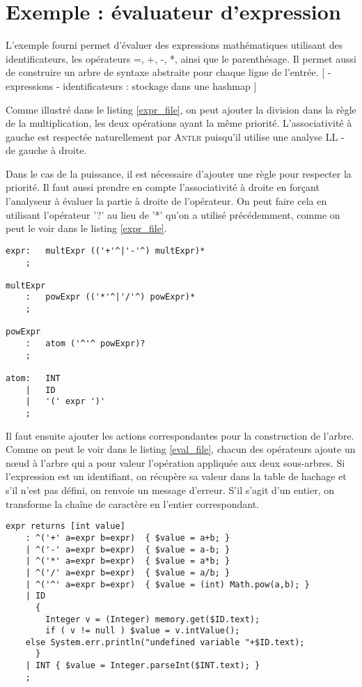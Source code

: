 \documentclass[paper=a4, fontsize=11pt]{scrartcl} %
\numberwithin{equation}{section} %
\numberwithin{figure}{section} %
\numberwithin{table}{section} %
\begin{document}

\section{Exemple : évaluateur d'expression}

L'exemple fourni permet d'évaluer des expressions mathématiques utilisant des identificateurs, les opérateurs =, +, -, *, ainsi que le parenthésage. Il permet aussi de construire un arbre de syntaxe abstraite pour chaque ligne de l'entrée.
[
- expressions
- identificateurs : stockage dans une hashmap
]


Comme illustré dans le listing \ref{expr_file}, on peut ajouter la division dans la règle de la multiplication, les deux opérations ayant la même priorité. L'associativité à gauche est respectée naturellement par \textsc{Antlr} puisqu'il utilise une analyse LL - de gauche à droite.

Dans le cas de la puissance, il est nécessaire d'ajouter une règle pour respecter la priorité. Il faut aussi prendre en compte l'associativité à droite en forçant l'analyseur à évaluer la partie à droite de l'opérateur. On peut faire cela en utilisant l'opérateur '?' au lieu de '*' qu'on a utilisé précédemment, comme on peut le voir dans le listing \ref{expr_file}.

    
\begin{lstlisting}[label=expr_file,caption=Fichier Expr.g,
linebackgroundcolor={\lstcolorlines[red!30]{8,9,10}\lstcolorlines[green!30]{5}}]
expr:   multExpr (('+'^|'-'^) multExpr)*
    ;

multExpr
    :   powExpr (('*'^|'/'^) powExpr)*
    ;

powExpr
    :   atom ('^'^ powExpr)?
    ;

atom:   INT
    |   ID
    |   '(' expr ')'
    ;
\end{lstlisting}

Il faut ensuite ajouter les actions correspondantes pour la construction de l'arbre. Comme on peut le voir dans le listing \ref{eval_file}, chacun des opérateurs ajoute un nœud à l'arbre qui a pour valeur l'opération appliquée aux deux sous-arbres. Si l'expression est un identifiant, on récupère sa valeur dans la table de hachage et s'il n'est pas défini, on renvoie un message d'erreur. S'il s'agit d'un entier, on transforme la chaîne de caractère en l'entier correspondant. 

\begin{lstlisting}[label=eval_file,caption=Fichier Eval.g,
linebackgroundcolor={\lstcolorlines[red!30]{6}\lstcolorlines[green!30]{5}}]
expr returns [int value]
    : ^('+' a=expr b=expr)  { $value = a+b; }
    | ^('-' a=expr b=expr)  { $value = a-b; }
    | ^('*' a=expr b=expr)  { $value = a*b; }
    | ^('/' a=expr b=expr)  { $value = a/b; }
    | ^('^' a=expr b=expr)  { $value = (int) Math.pow(a,b); }
    | ID
      {
        Integer v = (Integer) memory.get($ID.text);
        if ( v != null ) $value = v.intValue();
	else System.err.println("undefined variable "+$ID.text);
      }
    | INT { $value = Integer.parseInt($INT.text); }
    ;
\end{lstlisting}
\end{document}
